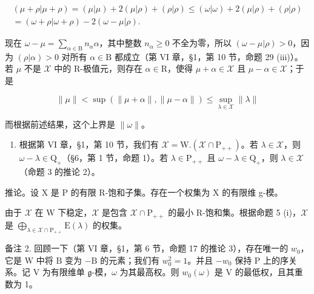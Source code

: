 \[
\begin{array}{c} (\mu + \rho | \mu + \rho) = (\mu | \mu) + 2 (\mu | \rho) + (\rho | \rho) \leq (\omega | \omega) + 2 (\mu | \rho) + (\rho | \rho) \\ = (\omega + \rho | \omega + \rho) - 2 (\omega - \mu | \rho). \end{array}
\]

现在 \(\omega - \mu = \sum_{\alpha \in \mathrm{B}} n_{\alpha} \alpha\)，其中整数 \(n_{\alpha} \geq 0\) 不全为零，所以 \((\omega - \mu | \rho) > 0\)，因为 \((\rho | \alpha) > 0\) 对所有 \(\alpha \in \mathrm{B}\) 都成立（第 VI 章，§1，第 10 节，命题 29 (iii)）。若 \(\mu\) 不是 \(\mathcal{X}\) 中的 R-极值元，则存在 \(\alpha \in \mathrm{R}\)，使得 \(\mu + \alpha \in \mathcal{X}\) 且 \(\mu - \alpha \in \mathcal{X}\)；于是

\[
\| \mu \| <   \sup (\| \mu + \alpha \|, \| \mu - \alpha \|) \leq \sup _ {\lambda \in \mathcal {X}} \| \lambda \|
\]

而根据前述结果，这个上界是 \(\|\omega\|\)。

\begin{enumerate}
\def\labelenumi{(\roman{enumi})}
\setcounter{enumi}{3}
\tightlist
\item
  根据第 VI 章，§1，第 10 节，我们有 \(\mathcal{X} = \mathrm{W.}(\mathcal{X}\cap \mathrm{P}_{++})\)。若 \(\lambda \in \mathcal{X}\)，则 \(\omega -\lambda \in \mathrm{Q}_{+}\)（§6，第 1 节，命题 1）。若 \(\lambda \in \mathrm{P}_{++}\) 且 \(\omega -\lambda \in \mathrm{Q}_{+}\)，则 \(\lambda \in \mathcal{X}\)（命题 3 的推论 2）。
\end{enumerate}

推论。设 X 是 P 的有限 R-饱和子集。存在一个权集为 X 的有限维 g-模。

由于 \(\mathcal{X}\) 在 W 下稳定，\(\mathcal{X}\) 是包含 \(\mathcal{X} \cap \mathrm{P}_{++}\) 的最小 R-饱和集。根据命题 5 (i)，\(\mathcal{X}\) 是 \(\bigoplus_{\lambda \in \mathcal{X} \cap \mathrm{P}_{++}} \mathrm{E}(\lambda)\) 的权集。

备注 2. 回顾一下（第 VI 章，§1，第 6 节，命题 17 的推论 3），存在唯一的 \(w_0\)，它是 \(\mathrm{W}\) 中将 \(\mathrm{B}\) 变为 \(-\mathrm{B}\) 的元素；我们有 \(w_0^2 = 1\)。并且 \(-w_0\) 保持 \(\mathrm{P}\) 上的序关系。记 \(\mathrm{V}\) 为有限维单 \(\mathfrak{g}\)-模，\(\omega\) 为其最高权。则 \(w_0(\omega)\) 是 \(\mathrm{V}\) 的最低权，且其重数为 1。

